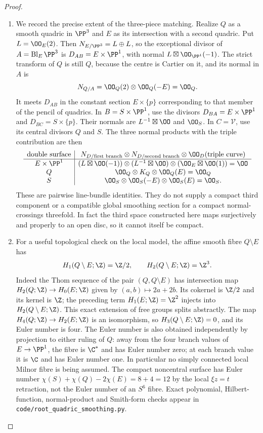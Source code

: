 \begin{proof}
\begin{enumerate}[label=\arabic*.,leftmargin=*]
\item We record the precise extent of the three-piece matching.
Realize $Q$ as a smooth quadric in $\PP^3$ and $E$ as its
intersection with a second quadric.  Put $L=\OO_E(2)$.
Then $N_{E/\PP^3}=L\oplus L$, so the exceptional divisor
of $A=\operatorname{Bl}_E\PP^3$ is
$D_{AB}=E\times\PP^1$, with normal
$L\boxtimes\OO_{\PP^1}(-1)$.
The strict transform of $Q$ is still $Q$, because the centre is
Cartier on it, and its normal in $A$ is
\[
 N_{Q/A}=\OO_Q(2)\otimes\OO_Q(-E)=\OO_Q.
\]
It meets $D_{AB}$ in the constant section $E\times\{p\}$
corresponding to that member of the pencil of quadrics.
In $B=S\times\PP^1$, use the divisors
$D_{BA}=E\times\PP^1$ and $D_{BC}=S\times\{p\}$.
Their normals are $L^{-1}\boxtimes\OO$ and $\OO_S$.
In $C=\mathcal V$, use its central divisors $Q$ and $S$.
The three normal products with the triple contribution are then
\[
\begin{array}{c|c}
 \text{double surface}&
 N_{D/\text{first branch}}\otimes
 N_{D/\text{second branch}}\otimes\OO_D(\text{triple curve})\\ \hline
 E\times\PP^1&
 (L\boxtimes\OO(-1))\otimes(L^{-1}\boxtimes\OO)
       \otimes(\OO_E\boxtimes\OO(1))=\OO\\
 Q&\OO_Q\otimes K_Q\otimes\OO_Q(E)=\OO_Q\\
 S&\OO_S\otimes\OO_S(-E)\otimes\OO_S(E)=\OO_S.
\end{array}
\]
These are pairwise line-bundle identities.  They do not supply
a compact third component or a compatible global smoothing
section for a compact normal-crossings threefold.
In fact the third space constructed here maps surjectively and
properly to an open disc, so it cannot itself be compact.

\item For a useful topological check on the local model,
the affine smooth fibre $Q\setminus E$ has
\[
 H_1(Q\setminus E;\Z)=\Z/2,\qquad
 H_2(Q\setminus E;\Z)=\Z^3.
\]
Indeed the Thom sequence of the pair $(Q,Q\setminus E)$ has
intersection map $H_2(Q;\Z)\to H_0(E;\Z)$ given by
$(a,b)\mapsto2a+2b$.  Its cokernel is $\Z/2$ and its
kernel is $\Z$; the preceding term $H_1(E;\Z)=\Z^2$
injects into $H_2(Q\setminus E;\Z)$.
This exact extension of free groups splits abstractly.
The map $H_4(Q;\Z)\to H_2(E;\Z)$ is an isomorphism,
so $H_3(Q\setminus E;\Z)=0$, and its Euler number is four.
The Euler number is also obtained independently by projection
to either ruling of $Q$: away from the four branch values of
$E\to\PP^1$, the fibre is $\C^*$ and has Euler number zero;
at each branch value it is $\C$ and has Euler number one.
In particular no simply connected local Milnor fibre is being
assumed.  The compact noncentral surface has Euler number
$\chi(S)+\chi(Q)-2\chi(E)=8+4=12$ by the local
$\xi z=t$ retraction, not the Euler number of an $S^6$ fibre.
Exact polynomial, Hilbert-function, normal-product and Smith-form
checks appear in \texttt{code/root\_quadric\_smoothing.py}.
\end{enumerate}
\end{proof}

